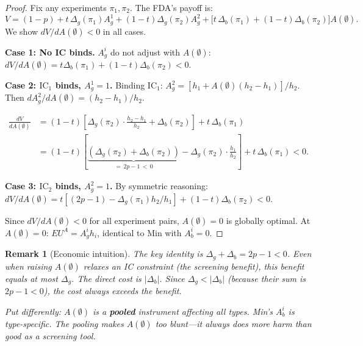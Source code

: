 \documentclass[12pt,a4paper]{article}
\newtheorem{remark}{Remark}
\begin{document}
\begin{proof}
Fix any experiments $\pi_1, \pi_2$. The FDA's payoff is:
\[
  V = (1-p)
    + t \, \Delta_g(\pi_1) A_g^1
    + (1-t) \Delta_g(\pi_2) A_g^2
    + \bigl[t \, \Delta_b(\pi_1)
      + (1-t) \Delta_b(\pi_2)\bigr] A(\emptyset).
\]
We show $dV/dA(\emptyset) < 0$ in all cases.

\medskip
\noindent\textbf{Case 1: No IC binds.}
$A_g^i$ do not adjust with $A(\emptyset)$:
$dV/dA(\emptyset) = t \Delta_b(\pi_1)
+ (1-t) \Delta_b(\pi_2) < 0$.

\medskip
\noindent\textbf{Case 2: $\mathrm{IC}_1$ binds,
$A_g^1 = 1$.}
Binding $\mathrm{IC}_1$:
$A_g^2 = [h_1 + A(\emptyset)(h_2 - h_1)]/h_2$.
Then $dA_g^2/dA(\emptyset) = (h_2 - h_1)/h_2$.

\begin{align*}
  \frac{dV}{dA(\emptyset)}
  &= (1-t)\left[
       \Delta_g(\pi_2) \cdot \frac{h_2 - h_1}{h_2}
       + \Delta_b(\pi_2)
     \right]
     + t \, \Delta_b(\pi_1) \\
  &= (1-t)\left[
       \underbrace{(\Delta_g(\pi_2) + \Delta_b(\pi_2))}
         _{= \, 2p-1 \, < \, 0}
       - \Delta_g(\pi_2) \cdot \frac{h_1}{h_2}
     \right]
     + t \, \Delta_b(\pi_1) < 0.
\end{align*}

\medskip
\noindent\textbf{Case 3: $\mathrm{IC}_2$ binds,
$A_g^2 = 1$.}
By symmetric reasoning:
$dV/dA(\emptyset) = t[(2p-1) - \Delta_g(\pi_1) h_2/h_1]
+ (1-t) \Delta_b(\pi_2) < 0$.

\medskip
Since $dV/dA(\emptyset) < 0$ for all experiment pairs,
$A(\emptyset) = 0$ is globally optimal. At
$A(\emptyset) = 0$: $EU^A = A_g^i h_i$, identical to Min
with $A_b^i = 0$.
\end{proof}

\begin{remark}[Economic intuition]
The key identity is $\Delta_g + \Delta_b = 2p - 1 < 0$.
Even when raising $A(\emptyset)$ relaxes an IC constraint
(the screening benefit), this benefit equals at most
$\Delta_g$. The direct cost is $|\Delta_b|$. Since
$\Delta_g < |\Delta_b|$ (because their sum is $2p-1 < 0$),
the cost always exceeds the benefit.

Put differently: $A(\emptyset)$ is a \textbf{pooled}
instrument affecting all types. Min's $A_b^i$ is
type-specific. The pooling makes $A(\emptyset)$ too
blunt---it always does more harm than good as a screening
tool.
\end{remark}


\end{document}
